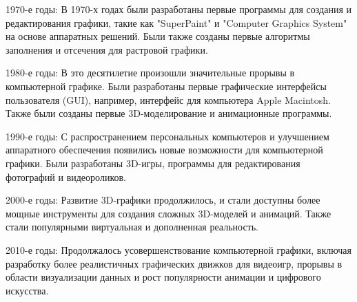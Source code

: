 \documentclass{beamer}
\begin{document}
	1970-е годы: В 1970-х годах были разработаны первые программы для создания и редактирования графики, такие как "SuperPaint" и "Computer Graphics System" на основе аппаратных решений. Были также созданы первые алгоритмы заполнения и отсечения для растровой графики.
	
	1980-е годы: В это десятилетие произошли значительные прорывы в компьютерной графике. Были разработаны первые графические интерфейсы пользователя (GUI), например, интерфейс для компьютера Apple Macintosh. Также были созданы первые 3D-моделирование и анимационные программы.
	
	1990-е годы: С распространением персональных компьютеров и улучшением аппаратного обеспечения появились новые возможности для компьютерной графики. Были разработаны 3D-игры, программы для редактирования фотографий и видеороликов.
	
	2000-е годы: Развитие 3D-графики продолжилось, и стали доступны более мощные инструменты для создания сложных 3D-моделей и анимаций. Также стали популярными виртуальная и дополненная реальность.
	
	2010-е годы: Продолжалось усовершенствование компьютерной графики, включая разработку более реалистичных графических движков для видеоигр, прорывы в области визуализации данных и рост популярности анимации и цифрового искусства.
	\begin{frame}
		
	\end{frame}

\begin{frame}
	
\end{frame}
\begin{frame}
	
\end{frame}
	
\end{document}

